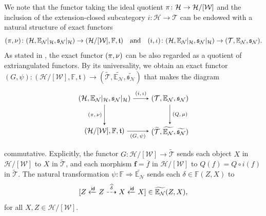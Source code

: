 \documentclass[a4paper,reqno,10pt]{amsart}
\theoremstyle{definition}
\theoremstyle{definition}
\theoremstyle{definition}
\theoremstyle{definition}
\theoremstyle{plain}
\newcommand{\id}{\mathsf{id}}
\newcommand{\fs}{\mathfrak{s}}
\newcommand{\ft}{\mathfrak{t}}
\newcommand{\BE}{\mathbb{E}}
\newcommand{\BF}{\mathbb{F}}
\newcommand{\CH}{\mathcal{H}}
\newcommand{\CN}{\mathcal{N}}
\newcommand{\CT}{\mathcal{T}}
\newcommand{\CW}{\mathcal{W}}
\begin{document}
\color{blue}
We note 
\normalcolor
that the functor taking the ideal quotient $\textcolor{blue}{\pi}\colon \CH\to\CH/[\CW]$ and the inclusion of the extension-closed subcategory $i\colon\CH\to\CT$ can be endowed with a natural structure of exact functors
\[
\textcolor{blue}{(\pi,\nu)}\colon(\CH,\BE_{\CN}|_{\CH},\fs_{\CN}|_{\CH})\to(\CH/[\CW],\BF,\ft)
\quad  \text{and} \quad
(i,\iota)\colon (\CH,\BE_{\CN}|_{\CH},\fs_{\CN}|_{\CH})\to(\CT,\BE_{\CN},\fs_{\CN}).
\]
As stated in \cite[Remark~3.35]{NOS22}, the exact functor $\textcolor{blue}{(\pi,\nu)}$ can be also regarded as a quotient of extriangulated functors. By its universality, we obtain an exact functor $(G,\psi)\colon (\CH/[\CW],\BF,\ft)\to(\widetilde{\CT},\widetilde{\BE_{\CN}},\widetilde{\fs_{\CN}})$ that makes the diagram
\[
\begin{tikzpicture}[>=stealth]
\node (1) at (-1.6,0.8) {$(\CH,\BE_{\CN}|_{\CH},\fs_{\CN}|_{\CH})$};
\node (2) at (1.6,0.8) {$(\CT,\BE_{\CN},\fs_{\CN})$};
\node (3) at (-1.6,-0.8) {$(\CH/[\CW],\BF,\ft)$};
\node (4) at (1.6,-0.8) {$(\widetilde{\CT},\widetilde{\BE_{\CN}},\widetilde{\fs_{\CN}})$};
\draw[->] (1) -- node[above,font=\scriptsize] {$(i,\iota)$} (2);
\draw[->] (1) -- node[left,font=\scriptsize] {$\textcolor{blue}{(\pi,\nu)}$} (3);
\draw[->] (2) -- node[right,font=\scriptsize] {$(Q,\mu)$} (4);
\draw[->] (3) -- node[below,font=\scriptsize] {$(G,\psi)$} (4);
\end{tikzpicture}
\]
commutative. 
Explicitly, the functor $G\colon\CH/[\CW]\to\widetilde{\CT}$ sends each object $X$ in $\CH/[\CW]$ to $X$ in $\widetilde{\CT}$, and each morphism $\mathbf{f}=\overline{f}$ in $\CH/[\CW]$ to $Q(f)=Q\circ i(f)$ in $\widetilde{\CT}$. The natural transformation $\psi\colon\BF\Rightarrow\widetilde{\BE_{\CN}}$ sends each $\delta\in\BF(Z,X)$ to 
\[
[Z\xleftarrow{\id}Z\overset{\textcolor{blue}{\widehat{\delta}}}{\dashrightarrow}X\xleftarrow{\id}X] \in \widetilde{\BE_{\CN}}(Z,X),
\]
for all $X,Z\in\CH/[\CW]$.
\end{document}

